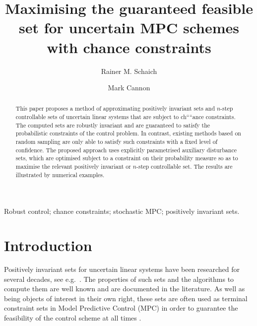 \documentclass{ifacconf}
\begin{document}
\begin{frontmatter}

\title{Maximising the guaranteed feasible set for uncertain MPC schemes with chance constraints}%


\author{Rainer M. Schaich} 
\qquad\qquad\author{Mark Cannon}


\address{\mbox{Department of Engineering Science, University of Oxford, OX1 3PJ, UK} e-mail: \{rainer.schaich,mark.cannon\}@eng.ox.ac.uk}


          
\begin{keyword}                           %
Robust control; chance constraints; stochastic MPC; positively invariant sets.
\end{keyword}                             %


\begin{abstract}                          %
This paper proposes a method of approximating positively invariant sets and $n$-step controllable sets of uncertain linear systems that are subject to ch````ance constraints. The computed sets are robustly invariant and are guaranteed to satisfy the probabilistic constraints of the control problem. In contrast, existing methods based on random sampling are only able to satisfy such constraints with a fixed level of confidence. The proposed approach uses explicitly parametrised auxiliary disturbance sets, which are optimised subject to a constraint on their probability measure so as to maximise the relevant positively invariant or $n$-step controllable set. The results are illustrated by numerical examples.
\end{abstract}

\end{frontmatter}


\section{Introduction}
%
%
Positively invariant sets for uncertain linear systems have been researched for several decades, see e.g.~\cite{Kolmanovsky:1995,Kolmanovsky:1998,blanchini:2007}.
%
The properties of such sets and the algorithms to compute them are well known and are documented in the literature.
%
As well as being objects of interest in their own right,
these sets are often used as terminal constraint sets in Model Predictive Control (MPC) in order to guarantee the feasibility of the control scheme at all times \citep[see e.g.][]{Mayne2014}.
%
\end{document}
